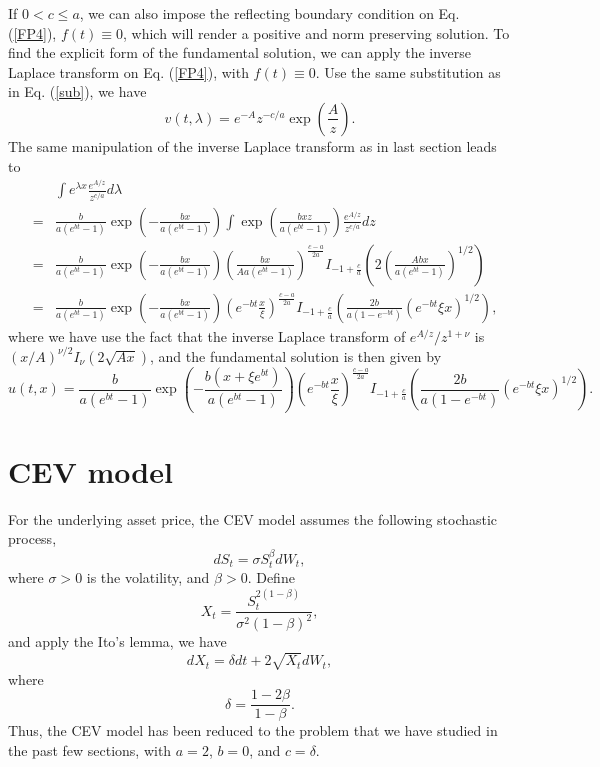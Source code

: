 \documentclass[12pt]{article}
\begin{document}
    If $0<c\le a$,
    we can also impose the reflecting boundary condition on Eq. (\ref{FP4}), $f(t)\equiv 0$, which will render a positive
    and norm preserving solution. To find the 
    explicit form of the fundamental solution, we can apply the inverse Laplace transform on Eq. (\ref{FP4}), with $f(t)\equiv 0$.
    Use the same substitution as in Eq. (\ref{sub}),
    we have
    \begin{equation}
      v(t,\lambda) = e^{-A}z^{-c/a}\exp\left(\frac{A}{z}\right).
    \end{equation}
    The same manipulation of the inverse Laplace transform as in last section leads to
    \begin{eqnarray}
      &&\int e^{\lambda x} \frac{e^{A/z}}{z^{c/a}}d\lambda\nonumber\\
      &=& \frac{b}{a(e^{bt}-1)}\exp\left(-\frac{bx}{a(e^{bt}-1)}\right)\int \exp\left(\frac{bxz}{a(e^{bt}-1)}\right)\frac{e^{A/z}}{z^{c/a}}dz \nonumber\\
      &=& \frac{b}{a(e^{bt}-1)}\exp\left(-\frac{bx}{a(e^{bt}-1)}\right)\left(\frac{bx}{Aa(e^{bt}-1)}\right)^{\frac{c-a}{2a}}I_{-1+\frac{c}{a}}\left(2\left(\frac{Abx}{a(e^{bt}-1)}\right)^{1/2}\right) \nonumber\\
      &=& \frac{b}{a(e^{bt}-1)}\exp\left(-\frac{bx}{a(e^{bt}-1)}\right)\left(e^{-bt}\frac{x}{\xi}\right)^{\frac{c-a}{2a}}I_{-1+\frac{c}{a}}\left(\frac{2b}{a(1-e^{-bt})}\left(e^{-bt}\xi x\right)^{1/2}\right),
    \end{eqnarray}
    where we have use the fact that the inverse Laplace transform of $e^{A/z}/z^{1+\nu}$ is $(x/A)^{\nu/2}I_{\nu}(2\sqrt{Ax})$, 
    and the fundamental solution is then given by
    \begin{equation}
      u(t,x)=\frac{b}{a(e^{bt}-1)}\exp\left(-\frac{b(x+\xi e^{bt})}{a(e^{bt}-1)}\right)\left(e^{-bt}\frac{x}{\xi}\right)^{\frac{c-a}{2a}}I_{-1+\frac{c}{a}}\left(\frac{2b}{a(1-e^{-bt})}\left(e^{-bt}\xi x\right)^{1/2}\right).
    \end{equation}



\section{CEV model}

  For the underlying asset price, the CEV model assumes the following stochastic process,
  \begin{equation}
    dS_t=\sigma S_t^{\beta}dW_t,
  \end{equation}
  where $\sigma>0$ is the volatility, and $\beta>0$. Define \cite{Brecher}
  \begin{equation}
    X_t=\frac{S_t^{2(1-\beta)}}{\sigma^2(1-\beta)^2},
  \end{equation}
  and apply the Ito's lemma, we have
  \begin{equation}
    dX_t = \delta dt + 2\sqrt{X_t}dW_t,
  \end{equation}
  where
  \begin{equation}
    \delta = \frac{1-2\beta}{1-\beta}.
  \end{equation}
  Thus, the CEV model has been reduced to the problem that we have studied in the past few sections, with
  $a=2$, $b=0$, and $c=\delta$.
\end{document}
